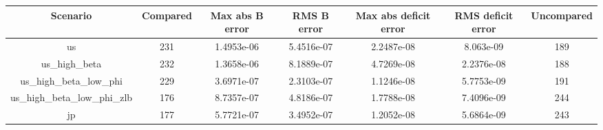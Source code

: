 \begin{table}[!ht]
\setlength\tabcolsep{0.425em}
\setlength\aboverulesep{0pt}
\setlength\belowrulesep{0.2em}
\centering
\begin{threeparttable}
\begin{tabular}{ccccccc}
\toprule[0.1em]
Scenario & Compared & Max abs B error & RMS B error & Max abs deficit error & RMS deficit error & Uncompared \\[0.2em]
\midrule[0.075em]
us & 231 & 1.4953e-06 & 5.4516e-07 & 2.2487e-08 & 8.063e-09 & 189 \\[0.2em]
us\_high\_beta & 232 & 1.3658e-06 & 8.1889e-07 & 4.7269e-08 & 2.2376e-08 & 188 \\[0.2em]
us\_high\_beta\_low\_phi & 229 & 3.6971e-07 & 2.3103e-07 & 1.1246e-08 & 5.7753e-09 & 191 \\[0.2em]
us\_high\_beta\_low\_phi\_zlb & 176 & 8.7357e-07 & 4.8186e-07 & 1.7788e-08 & 7.4096e-09 & 244 \\[0.2em]
jp & 177 & 5.7721e-07 & 3.4952e-07 & 1.2052e-08 & 5.6864e-09 & 243 \\[0.2em]
\bottomrule[0.1em]
\end{tabular}
\end{threeparttable}
\end{table}
